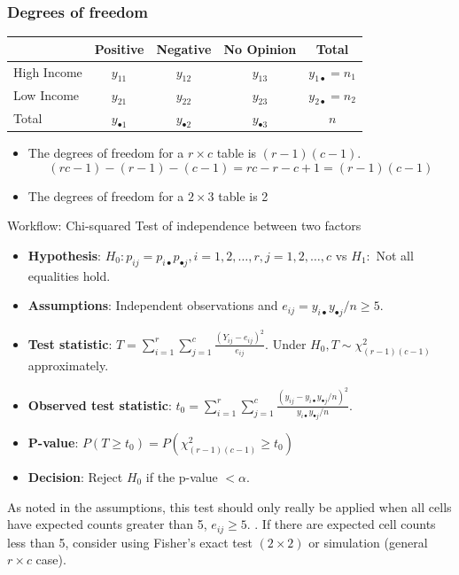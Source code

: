 \documentclass[a4paper]{article}\usepackage[]{graphicx}\usepackage[]{xcolor}
\begin{document}
\subsubsection{Degrees of freedom}
\begin{table}[H]
	\centering
	\begin{tabular}{@{}lccc|c@{}}
	\toprule
				& Positive  	      & Negative		    & No Opinion		  & Total                     \\ \midrule
	High Income & \( y_{11} \)		  & \( y_{12} \) 	    & \( y_{13} \) 		  & \( y_{1 \bullet} = n_1 \) \\
	Low Income  & \( y_{21} \) 		  & \( y_{22} \) 	    & \( y_{23} \) 		  & \( y_{2 \bullet} = n_2 \) \\ \midrule
	Total       & \( y_{\bullet 1} \) & \( y_{\bullet 2} \) & \( y_{\bullet 3} \) & \( n \) 				  \\ \bottomrule
	\end{tabular}
\end{table}
\begin{itemize}
	\item The degrees of freedom for a \( r \times c \) table is \( (r-1)(c-1) \).
	\[
		(rc-1)-(r-1)-(c-1) = rc-r-c+1 = (r-1)(c-1)
	\]
	\item The degrees of freedom for a \( 2 \times 3 \) table is 2
\end{itemize}
\begin{redbox}{Workflow: Chi-squared Test of independence between two factors}
	\begin{itemize}
		\item \textbf{Hypothesis}: \( H_0: p_{ij} = p_{i \bullet} p_{\bullet j}, i = 1,2,\dotsc,r, j = 1,2,\dotsc,c \) vs \( H_1: \) Not all equalities hold. 
		\item \textbf{Assumptions}: Independent observations and  \( e_{ij} =y_{i \bullet} y_{\bullet j}/n \geq 5 \).
		\item \textbf{Test statistic}: \( T = \sum\limits_{i=1}^{r}\sum\limits_{j=1}^{c} \frac{(Y_{ij} - e_{ij})^2}{e_{ij}} \). Under \( H_0, T \sim \chi^2_{(r-1)(c-1)} \) approximately.
		\item \textbf{Observed test statistic}: \( t_0 = \sum_{i=1}^{r}\sum_{j=1}^{c}\frac{(y_{ij} - y_{i \bullet} y_{\bullet j}/n)^2}{y_{i \bullet}y_{\bullet j}/n} \).
		\item \textbf{P-value}: \( P(T\geq t_0) = P(\chi^2_{(r-1)(c-1)} \geq t_0) \)
		\item \textbf{Decision}: Reject \( H_0 \) if the p-value \( < \alpha \).
	\end{itemize}
\end{redbox}
As noted in the assumptions, this test should only really be applied when all cells have expected counts greater than 5, \( e_{ij} \geq 5 \). . If there are expected cell counts less than 5, consider using Fisher's exact test \( (2 \times 2) \) or simulation (general \( r \times c \) case).
\end{document}
